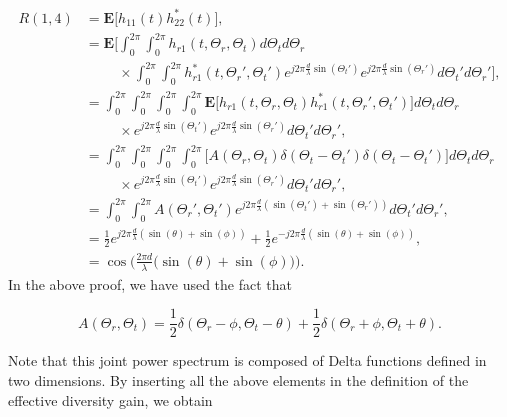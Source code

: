 \documentclass [a4paper, 11pt] {article}
\begin{document}
\begin{solution}
\begin{enumerate}
\begin{itemize}
        \begin{align}
        R(1,4) &= \mathbf{E}\Big[h_{11}(t)h_{22}^*(t) \Big], \\
        &= \mathbf{E}\Bigg[\int_{0}^{2\pi} \int_{0}^{2\pi}h_{r1}(t,\Theta_r,\Theta_t) d\Theta_t d\Theta_r \nonumber\\
        &\hspace{1cm}\times \int_{0}^{2\pi} \int_{0}^{2\pi}h_{r1}^*(t,\Theta_r',\Theta_t')e^{j2\pi\frac{d}{\lambda}\sin(\Theta_t')}e^{j2\pi\frac{d}{\lambda}\sin(\Theta_r')} d\Theta_t' d\Theta_r'\Bigg] ,\\
        &= \int_{0}^{2\pi} \int_{0}^{2\pi}\int_{0}^{2\pi} \int_{0}^{2\pi} \mathbf{E}\Big[h_{r1}(t,\Theta_r,\Theta_t)h_{r1}^*(t,\Theta_r',\Theta_t')\Big] d\Theta_t d\Theta_r \nonumber \\
        &\hspace{1cm}\times e^{j2\pi\frac{d}{\lambda}\sin(\Theta_t')} e^{j2\pi\frac{d}{\lambda}\sin(\Theta_r')} d\Theta_t' d\Theta_r' ,\\
        &= \int_{0}^{2\pi} \int_{0}^{2\pi}\int_{0}^{2\pi} \int_{0}^{2\pi}  \Big[A(\Theta_r,\Theta_t)\delta(\Theta_t - \Theta_t') \delta(\Theta_t - \Theta_t')\Big] d\Theta_t d\Theta_r \nonumber \\
        &\hspace{1cm}\times e^{j2\pi\frac{d}{\lambda}\sin(\Theta_t')} e^{j2\pi\frac{d}{\lambda}\sin(\Theta_r')} d\Theta_t' d\Theta_r', \\
        &= \int_{0}^{2\pi} \int_{0}^{2\pi} A(\Theta_r',\Theta_t')  e^{j2\pi\frac{d}{\lambda}(\sin(\Theta_t')+\sin(\Theta_r'))} d\Theta_t' d\Theta_r', \\
        &= \frac{1}{2}e^{j2\pi\frac{d}{\lambda}(\sin(\theta)+\sin(\phi))}
        + \frac{1}{2}e^{-j2\pi\frac{d}{\lambda}(\sin(\theta)+\sin(\phi))}, \\
        &= \cos \bigg( \frac{2 \pi d}{\lambda} \big(\sin (\theta) +\sin (\phi)\big)\bigg).
    \end{align}
    In the above proof, we have used the fact that

    \begin{equation}
        A(\Theta_r,\Theta_t) = \frac{1}{2} \delta(\Theta_r - \phi,\Theta_t - \theta)+ \frac{1}{2} \delta(\Theta_r + \phi,\Theta_t + \theta).
    \end{equation}

    Note that this joint power spectrum is composed of Delta functions defined in two dimensions. By inserting all the above elements in the definition of the effective diversity gain, we obtain


\end{itemize}
\end{enumerate}
\end{solution}
\end{document}
